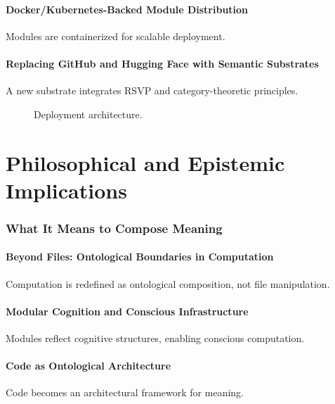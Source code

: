 \documentclass[12pt]{article}
\begin{document}
\subsection{Docker/Kubernetes-Backed Module Distribution}
Modules are containerized for scalable deployment.

\subsection{Replacing GitHub and Hugging Face with Semantic Substrates}
A new substrate integrates RSVP and category-theoretic principles.

\begin{figure}[h]
    \centering
    \caption{Deployment architecture.}
\end{figure}

\part{Philosophical and Epistemic Implications}

\section{What It Means to Compose Meaning}
\subsection{Beyond Files: Ontological Boundaries in Computation}
Computation is redefined as ontological composition, not file manipulation.

\subsection{Modular Cognition and Conscious Infrastructure}
Modules reflect cognitive structures, enabling conscious computation.

\subsection{Code as Ontological Architecture}
Code becomes an architectural framework for meaning.
\end{document}
